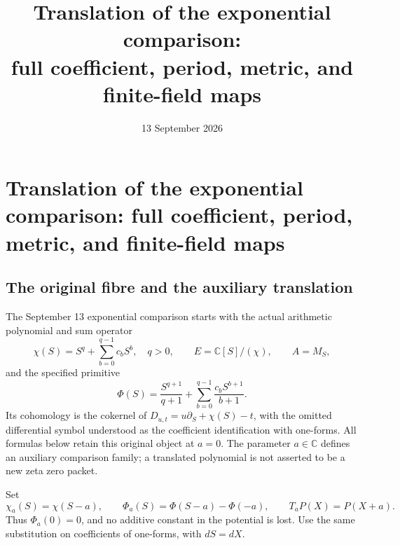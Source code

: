 \begingroup
\def\Tr{\operatorname{Tr}}
\def\im{\operatorname{im}}
\def\id{\operatorname{id}}
\section{Translation of the exponential comparison: full coefficient, period, metric, and finite-field maps}

\title{Translation of the exponential comparison:\\full coefficient, period, metric, and finite-field maps}
\author{}
\date{13 September 2026}


\subsection{The original fibre and the auxiliary translation}
The September 13 exponential comparison starts with the actual arithmetic
polynomial and sum operator
\[
 \chi(S)=S^q+\sum_{b=0}^{q-1}c_bS^b,\quad q>0,\qquad
 E=\mathbb C[S]/(\chi),\qquad A=M_S,
\]
and the specified primitive
\[
 \Phi(S)=\frac{S^{q+1}}{q+1}
       +\sum_{b=0}^{q-1}\frac{c_bS^{b+1}}{b+1}.
\]
Its cohomology is the cokernel of
\(D_{u,t}=u\partial_S+\chi(S)-t\), with the omitted differential symbol
understood as the coefficient identification with one-forms. All formulas
below retain this original object at \(a=0\). The parameter \(a\in\mathbb C\)
defines an auxiliary comparison family; a translated polynomial is not
asserted to be a new zeta zero packet.

Set
\begin{equation}\tag{DT.1}
 \chi_a(S)=\chi(S-a),\qquad
 \Phi_a(S)=\Phi(S-a)-\Phi(-a),\qquad
 T_aP(X)=P(X+a).
\end{equation}
Thus \(\Phi_a(0)=0\), and no additive constant in the potential is lost.
Use the same substitution on coefficients of one-forms, with \(dS=dX\).

